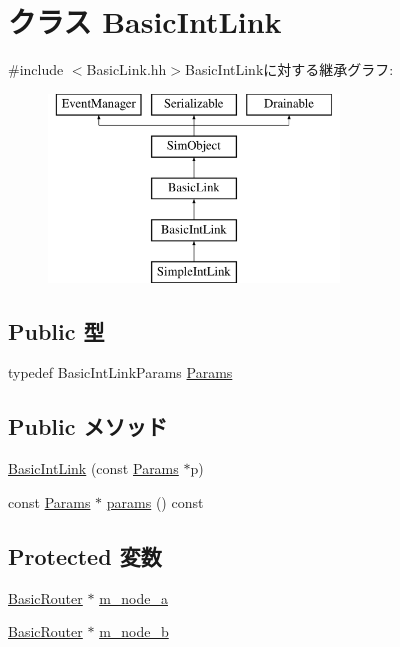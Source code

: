 \hypertarget{classBasicIntLink}{
\section{クラス BasicIntLink}
\label{classBasicIntLink}
}


{\ttfamily \#include $<$BasicLink.hh$>$}BasicIntLinkに対する継承グラフ:\begin{figure}[H]
\begin{center}
\leavevmode
\includegraphics[height=5cm]{classBasicIntLink}
\end{center}
\end{figure}
\subsection*{Public 型}
\begin{DoxyCompactItemize}
\item 
typedef BasicIntLinkParams \hyperlink{classBasicIntLink_a22036d2d68b49d72b25678790aae2c9e}{Params}
\end{DoxyCompactItemize}
\subsection*{Public メソッド}
\begin{DoxyCompactItemize}
\item 
\hyperlink{classBasicIntLink_a2cb2526aa9f51c88e4ef6ff356c8a866}{BasicIntLink} (const \hyperlink{classBasicIntLink_a22036d2d68b49d72b25678790aae2c9e}{Params} $\ast$p)
\item 
const \hyperlink{classBasicIntLink_a22036d2d68b49d72b25678790aae2c9e}{Params} $\ast$ \hyperlink{classBasicIntLink_acd3c3feb78ae7a8f88fe0f110a718dff}{params} () const 
\end{DoxyCompactItemize}
\subsection*{Protected 変数}
\begin{DoxyCompactItemize}
\item 
\hyperlink{classBasicRouter}{BasicRouter} $\ast$ \hyperlink{classBasicIntLink_a94b382c61156ea4668be8cc92e2e4cbe}{m\_\-node\_\-a}
\item 
\hyperlink{classBasicRouter}{BasicRouter} $\ast$ \hyperlink{classBasicIntLink_aa463d3b72f965545f533b2268d7eb1b5}{m\_\-node\_\-b}
\end{DoxyCompactItemize}

